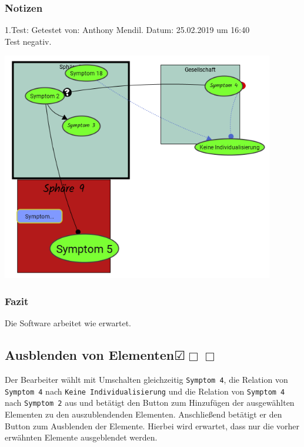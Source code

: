 \documentclass{scrartcl}
\newcommand{\subsectiont}[2]{\subsection[#1]{#1{\normalsize\normalfont #2}}}
\newcommand{\leer}{$\Box$}
\newcommand{\ok}{$\CheckedBox$}
\begin{document}
\subsubsection{Notizen}
1.Test: Getestet von: Anthony Mendil. Datum: 25.02.2019 um 16:40 \\
Test negativ. 
\begin{center}
\includegraphics[height=10cm]{3_52.PNG}
\end{center}
\subsubsection{Fazit}
Die Software arbeitet wie erwartet.

\subsectiont{Ausblenden von Elementen}{\dotfill\ok\leer\leer}
Der Bearbeiter wählt mit Umschalten gleichzeitig \texttt{Symptom 4}, die Relation von  \texttt{Symptom 4} nach \texttt{Keine Individualisierung} und die Relation von \texttt{Symptom 4} nach \texttt{Symptom 2} aus und betätigt den Button zum Hinzufügen der ausgewählten Elementen zu den auszublendenden Elementen. Anschließend betätigt er den Button zum Ausblenden der Elemente. Hierbei wird erwartet, dass nur die vorher erwähnten Elemente ausgeblendet werden. 
\end{document}
